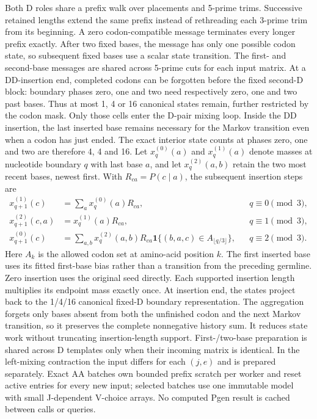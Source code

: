 \documentclass[11pt]{article}
\theoremstyle{oldplain}
\theoremstyle{oldrem}
\begin{document}
Both D roles share a prefix walk over placements and 5-prime trims. Successive
retained lengths extend the same prefix instead of rethreading each 3-prime
trim from its beginning. A zero codon-compatible message terminates every
longer prefix exactly. After two fixed bases, the message has only one possible
codon state, so subsequent fixed bases use a scalar state transition.
The first- and second-base messages are shared across 5-prime cuts for each
input matrix. At a DD-insertion end, completed codons can be forgotten before
the fixed second-D block: boundary phases zero, one and two need respectively
zero, one and two past bases. Thus at most 1, 4 or 16 canonical states remain,
further restricted by the codon mask. Only those cells enter the D-pair mixing
loop. Inside the DD insertion, the last inserted base remains necessary for the
Markov transition even when a codon has just ended. The exact interior state
counts at phases zero, one and two are therefore 4, 4 and 16. Let $x_q^{(0)}(a)$
and $x_q^{(1)}(a)$ denote masses at nucleotide boundary $q$ with last base $a$,
and let $x_q^{(2)}(a,b)$ retain the two most recent bases, newest first.
With $R_{ca}=P(c\mid a)$, the subsequent insertion steps are
\begin{align}
 x_{q+1}^{(1)}(c) &= \sum_a x_q^{(0)}(a)R_{ca}, &&q\equiv0\pmod3,\\
 x_{q+1}^{(2)}(c,a) &= x_q^{(1)}(a)R_{ca}, &&q\equiv1\pmod3,\\
 x_{q+1}^{(0)}(c) &= \sum_{a,b}x_q^{(2)}(a,b)R_{ca}
       \mathbf{1}\{(b,a,c)\in A_{\lfloor q/3\rfloor}\}, &&q\equiv2\pmod3.
\end{align}
Here $A_k$ is the allowed codon set at amino-acid position $k$. The first inserted
base uses its fitted first-base bias rather than a transition from the preceding
germline. Zero insertion uses the original seed directly. Each supported
insertion length multiplies its endpoint mass exactly once. At insertion end,
the states project back to the 1/4/16 canonical fixed-D boundary representation.
The aggregation forgets only bases absent from both the unfinished codon and the
next Markov transition, so it preserves the complete nonnegative history sum.
It reduces state work without truncating insertion-length support.
First-/two-base preparation is shared across D templates only when their incoming
matrix is identical. In the left-mixing contraction the input differs for each
$(j,e)$ and is prepared separately. Exact AA batches own bounded prefix scratch
per worker and reset active entries for every new input; selected batches use
one immutable model with small J-dependent V-choice arrays. No computed Pgen
result is cached between calls or queries.
\end{document}
